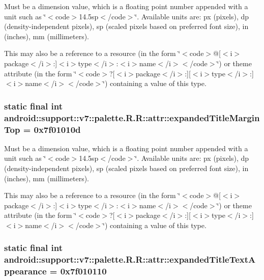 Must be a dimension value, which is a floating point number appended with a unit such as \char`\"{}$<$code$>$14.5sp$<$/code$>$\char`\"{}. Available units are: px (pixels), dp (density-independent pixels), sp (scaled pixels based on preferred font size), in (inches), mm (millimeters). 

This may also be a reference to a resource (in the form \char`\"{}$<$code$>$@\mbox{[}$<$i$>$package$<$/i$>$:\mbox{]}$<$i$>$type$<$/i$>$:$<$i$>$name$<$/i$>$$<$/code$>$\char`\"{}) or theme attribute (in the form \char`\"{}$<$code$>$?\mbox{[}$<$i$>$package$<$/i$>$:\mbox{]}\mbox{[}$<$i$>$type$<$/i$>$:\mbox{]}$<$i$>$name$<$/i$>$$<$/code$>$\char`\"{}) containing a value of this type. \hypertarget{classandroid_1_1support_1_1v7_1_1palette_1_1_r_1_1attr_2803672178c4c302f5dfd2a684fdd88b}{
\subsubsection[{expandedTitleMarginTop}]{\setlength{\rightskip}{0pt plus 5cm}static final int android::support::v7::palette.R.R::attr::expandedTitleMarginTop = 0x7f01010d}}
\label{classandroid_1_1support_1_1v7_1_1palette_1_1_r_1_1attr_2803672178c4c302f5dfd2a684fdd88b}


Must be a dimension value, which is a floating point number appended with a unit such as \char`\"{}$<$code$>$14.5sp$<$/code$>$\char`\"{}. Available units are: px (pixels), dp (density-independent pixels), sp (scaled pixels based on preferred font size), in (inches), mm (millimeters). 

This may also be a reference to a resource (in the form \char`\"{}$<$code$>$@\mbox{[}$<$i$>$package$<$/i$>$:\mbox{]}$<$i$>$type$<$/i$>$:$<$i$>$name$<$/i$>$$<$/code$>$\char`\"{}) or theme attribute (in the form \char`\"{}$<$code$>$?\mbox{[}$<$i$>$package$<$/i$>$:\mbox{]}\mbox{[}$<$i$>$type$<$/i$>$:\mbox{]}$<$i$>$name$<$/i$>$$<$/code$>$\char`\"{}) containing a value of this type. \hypertarget{classandroid_1_1support_1_1v7_1_1palette_1_1_r_1_1attr_c9c61a3fee1ac4992a3775b1f7cd5cb5}{
\subsubsection[{expandedTitleTextAppearance}]{\setlength{\rightskip}{0pt plus 5cm}static final int android::support::v7::palette.R.R::attr::expandedTitleTextAppearance = 0x7f010110}}
\label{classandroid_1_1support_1_1v7_1_1palette_1_1_r_1_1attr_c9c61a3fee1ac4992a3775b1f7cd5cb5}


